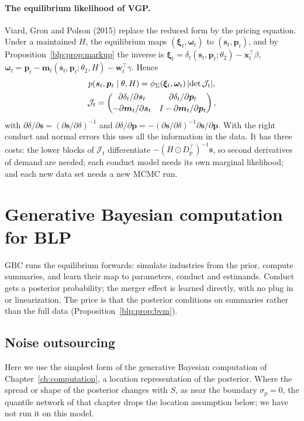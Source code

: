 \paragraph{The equilibrium likelihood of VGP.} Viard, Gron and Polson (2015) replace the reduced form by the pricing equation. Under a maintained $H$, the
equilibrium maps $(\bm\xi_t,\bm\omega_t)$ to $(\bm s_t,\bm p_t)$, and by
Proposition~\ref{blp:prop:markup} the inverse is $\bm\xi_t = \delta_t(\bm s_t,\bm p_t;\theta_2) -
\bm x_t^\top\beta$, $\bm\omega_t = \bm p_t - \bm m_t(\bm s_t,\bm p_t;\theta_2,H) - \bm w_t^\top\gamma$.
Hence
\begin{gather}\label{blp:eq:vgp}
  p(\bm s_t,\bm p_t\mid\theta,H) = \phi_\Sigma(\bm\xi_t,\bm\omega_t)\,
  \lvert\det \mathcal J_t\rvert,\\
  \mathcal J_t = \begin{pmatrix}
  \partial\delta_t/\partial\bm s_t & \partial\delta_t/\partial\bm p_t\\[2pt]
  -\partial\bm m_t/\partial\bm s_t & I - \partial\bm m_t/\partial\bm p_t
  \end{pmatrix},\notag
\end{gather}
with $\partial\delta/\partial\bm s = (\partial\bm s/\partial\delta)^{-1}$ and
$\partial\delta/\partial\bm p = -(\partial\bm s/\partial\delta)^{-1}\partial\bm s/\partial\bm p$.
With the right conduct and normal errors this uses all the information in the data. It has three costs: the lower blocks of $\mathcal J_t$ differentiate $-(H\odot D_p^\top)^{-1}\bm s$, so second derivatives of demand are needed; each conduct model needs its own marginal likelihood; and each new data set needs a new MCMC run.

\section[GBC for BLP]{Generative Bayesian computation for BLP}\label{blp:sec:gbc}

GBC runs the equilibrium forwards: simulate industries from the prior, compute summaries, and learn their map to parameters, conduct and estimands. Conduct gets a posterior probability; the merger effect is learned directly, with no plug in or linearization. The price is that the posterior conditions on summaries rather than the full data (Proposition~\ref{blp:prop:bvm}).

\subsection{Noise outsourcing}
Here we use the simplest form of the generative Bayesian computation of Chapter~\ref{ch:computation}, a location representation of the posterior. Where the spread or shape of the posterior changes with $S$, as near the boundary $\sigma_p=0$, the quantile network of that chapter drops the location assumption below; we have not run it on this model.

